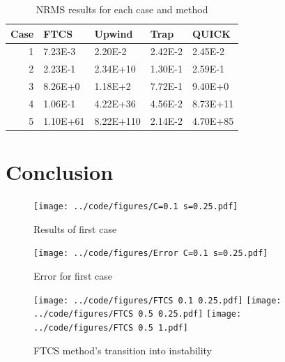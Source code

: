 \documentclass[twocolumn,10pt]{asme2ej}
\begin{document}
\begin{table}[htb]
\begin{center}
\begin{tabular}{|r | l l l l|}
\hline
Case & FTCS & Upwind & Trap & QUICK  \\
\hline
1 & 7.23E-3  & 2.20E-2   & 2.42E-2 & 2.45E-2  \\
2 & 2.23E-1  & 2.34E+10  & 1.30E-1 & 2.59E-1  \\
3 & 8.26E+0  & 1.18E+2   & 7.72E-1 & 9.40E+0  \\
4 & 1.06E-1  & 4.22E+36  & 4.56E-2 & 8.73E+11 \\
5 & 1.10E+61 & 8.22E+110 & 2.14E-2 & 4.70E+85 \\
\hline
\end{tabular}
\caption{NRMS results for each case and method}
\label{rms_table}
\end{center}
\end{table}

\section{Conclusion}

\nocite{*}



\begin{figure}[thb]
\begin{center}
\texttt{[image: ../code/figures/C=0.1 s=0.25.pdf]}
\caption{Results of first case}
\label{case_1_results}
\end{center}
\end{figure}

\begin{figure}[thb]
\begin{center}
\texttt{[image: ../code/figures/Error C=0.1 s=0.25.pdf]}
\caption{Error for first case}
\label{case_1_error}
\end{center}
\end{figure}

\begin{figure}[thb]
\begin{center}
\texttt{[image: ../code/figures/FTCS 0.1 0.25.pdf]}
\texttt{[image: ../code/figures/FTCS 0.5 0.25.pdf]}
\texttt{[image: ../code/figures/FTCS 0.5 1.pdf]}
\caption{FTCS method's transition into instability}
\label{FTCS_transition}
\end{center}
\end{figure}
\end{document}
